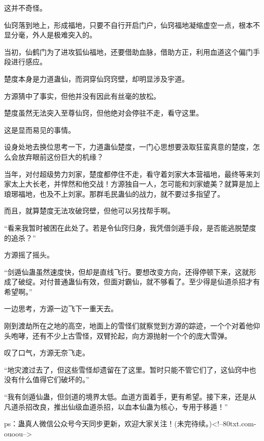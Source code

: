 \begin{this_body}
这并不奇怪。

仙窍落到地上，形成福地，只要不自行开启门户，仙窍福地凝缩虚空一点，根本不显分毫，外人是极难突入的。

当初，仙鹤门为了进攻狐仙福地，还要借助血脉，借助方正，利用血道这个偏门手段进行感应。

楚度本身是力道蛊仙，而洞穿仙窍窍壁，却明显涉及宇道。

方源猜中了事实，但他并没有因此有丝毫的放松。

楚度虽然无法突入至尊仙窍，但他绝对会停驻不走，看守这里。

这是显而易见的事情。

设身处地去换位思考一下，力道蛊仙楚度，一门心思想要汲取狂蛮真意的楚度，怎么会放弃眼前这份巨大的机缘？

当年，对付超级势力刘家，楚度都停住不走，看守着刘家大本营福地，最终等来刘家太上大长老，并悍然和他交战！方源独自一人，怎可能和刘家媲美？就算是加上琅琊福地，也及不上刘家。那群毛民蛊仙的战力，就不要过多指望了。

而且，就算楚度无法攻破窍壁，但他可以另找帮手啊。

“看来我暂时被困在此处了。若是令仙窍归身，我凭借剑遁手段，是否能逃脱楚度的追杀？”

方源摇了摇头。

“剑遁仙蛊虽然速度快，但却是直线飞行。要想改变方向，还得停顿下来，这就形成了破绽。对付普通蛊仙有效，但面对霸仙，就不够看了。至少得是仙道杀招才有希望啊。”

一边思考，方源一边飞下一重天去。

刚到渡劫所在之地的高空，地面上的雪怪们就察觉到方源的踪迹，一个个对着他仰头咆哮，还有不少上古雪怪，双臂抡起，向方源抛射一个个的庞大雪弹。

叹了口气，方源无奈飞走。

“地灾渡过去了，但这些雪怪却遗留在了这里。暂时只能不管它们了，这仙窍中也没有什么值得它们破坏的。”

“我有剑遁仙蛊，但剑道的境界太低。血道方面着手，更有希望。接下来，还是从凡道杀招改良，推出仙级血道杀招，以血本仙蛊为核心，专用于移遁！”

ps：蛊真人微信公众号今天同步更新，欢迎大家关注！(未完待续。)<!--80txt.com-ouoou-->

\end{this_body}

